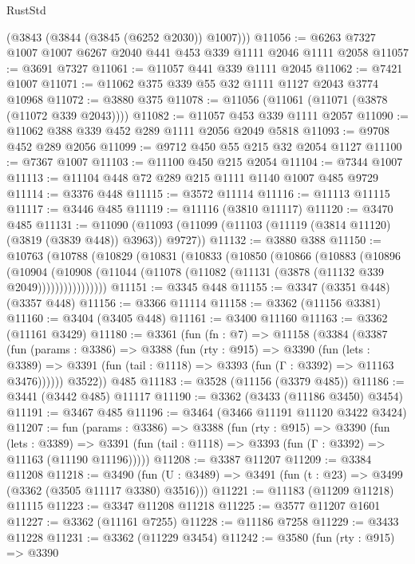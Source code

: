 \begin{lexlean}{RustStd}
\begin{coremodule}
      (@3843 (@3844 (@3845 (@6252 @2030)) @1007)))
@11056 := @6263 @7327 @1007 @1007 @6267 @2040 @441 @453 @339 @1111 @2046 @1111 @2058
@11057 := @3691 @7327
@11061 := @11057 @441 @339 @1111 @2045
@11062 := @7421 @1007
@11071 := @11062 @375 @339 @55 @32 @1111 @1127 @2043 @3774 @10968
@11072 := @3880 @375
@11078 := @11056 (@11061 (@11071 (@3878 (@11072 @339 @2043))))
@11082 := @11057 @453 @339 @1111 @2057
@11090 := @11062 @388 @339 @452 @289 @1111 @2056 @2049 @5818
@11093 := @9708 @452 @289 @2056
@11099 := @9712 @450 @55 @215 @32 @2054 @1127
@11100 := @7367 @1007
@11103 := @11100 @450 @215 @2054
@11104 := @7344 @1007
@11113 := @11104 @448 @72 @289 @215 @1111 @1140 @1007 @485 @9729
@11114 := @3376 @448
@11115 := @3572 @11114
@11116 := @11113 @11115
@11117 := @3446 @485
@11119 := @11116 (@3810 @11117)
@11120 := @3470 @485
@11131 := @11090 (@11093 (@11099 (@11103 (@11119 (@3814 @11120) (@3819 (@3839 @448)) @3963)) @9727))
@11132 := @3880 @388
@11150 := @10763
    (@10788
      (@10829
        (@10831
          (@10833
            (@10850
              (@10866
                (@10883
                  (@10896
                    (@10904
                      (@10908
                        (@11044 (@11078 (@11082 (@11131 (@3878 (@11132 @339 @2049))))))))))))))))
@11151 := @3345 @448
@11155 := @3347 (@3351 @448) (@3357 @448)
@11156 := @3366 @11114
@11158 := @3362 (@11156 @3381)
@11160 := @3404 (@3405 @448)
@11161 := @3400 @11160
@11163 := @3362 (@11161 @3429)
@11180 := @3361
    (fun (fn : @7) =>
    @11158
      (@3384
        (@3387
          (fun (params : @3386) =>
          @3388
            (fun (rty : @915) =>
            @3390
              (fun (lets : @3389) =>
              @3391 (fun (tail : @1118) => @3393 (fun (Γ : @3392) => @11163 @3476))))))
        @3522))
    @485
@11183 := @3528 (@11156 (@3379 @485))
@11186 := @3441 (@3442 @485) @11117
@11190 := @3362 (@3433 (@11186 @3450) @3454)
@11191 := @3467 @485
@11196 := @3464 (@3466 @11191 @11120 @3422 @3424)
@11207 := fun (params : @3386) =>
  @3388
    (fun (rty : @915) =>
    @3390
      (fun (lets : @3389) =>
      @3391 (fun (tail : @1118) => @3393 (fun (Γ : @3392) => @11163 (@11190 @11196)))))
@11208 := @3387 @11207
@11209 := @3384 @11208
@11218 := @3490
    (fun (U : @3489) => @3491 (fun (t : @23) => @3499 (@3362 (@3505 @11117 @3380) @3516)))
@11221 := @11183 (@11209 @11218) @11115
@11223 := @3347 @11208 @11218
@11225 := @3577 @11207 @1601
@11227 := @3362 (@11161 @7255)
@11228 := @11186 @7258
@11229 := @3433 @11228
@11231 := @3362 (@11229 @3454)
@11242 := @3580
    (fun (rty : @915) =>
    @3390

\end{coremodule}
\end{lexlean}
